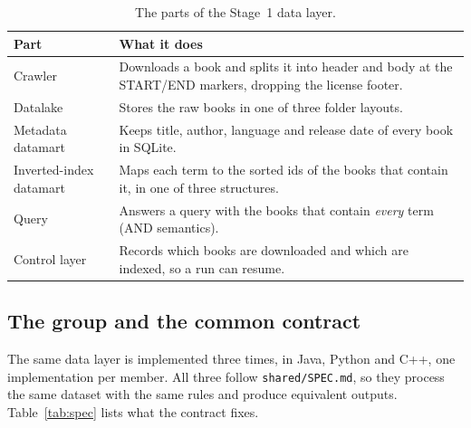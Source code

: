 \documentclass[11pt,a4paper]{article}
\newcommand{\code}[1]{\texttt{#1}}
\begin{document}
\begin{table}[H]
\centering\small
\begin{tabularx}{\linewidth}{@{}L{3.4cm} Y@{}}
\toprule
Part & What it does \\
\midrule
Crawler & Downloads a book and splits it into header and body at the START/END markers, dropping the license footer. \\
Datalake & Stores the raw books in one of three folder layouts. \\
Metadata datamart & Keeps title, author, language and release date of every book in SQLite. \\
Inverted-index datamart & Maps each term to the sorted ids of the books that contain it, in one of three structures. \\
Query & Answers a query with the books that contain \emph{every} term (AND semantics). \\
Control layer & Records which books are downloaded and which are indexed, so a run can resume. \\
\bottomrule
\end{tabularx}
\caption{The parts of the Stage~1 data layer.}
\label{tab:layers}
\end{table}

\subsection{The group and the common contract}
The same data layer is implemented three times, in Java, Python and C++, one implementation per
member. All three follow \code{shared/SPEC.md}, so they process the same dataset with the same rules
and produce equivalent outputs. Table~\ref{tab:spec} lists what the contract fixes.
\end{document}
